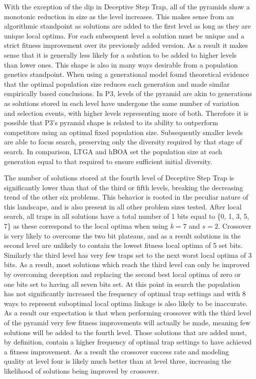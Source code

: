 \documentclass[twoside]{article}
\begin{document}
With the exception of the dip in Deceptive Step Trap, all of the pyramids show a monotonic reduction
in size as the level increases. This makes sense from an algorithmic standpoint as solutions are
added to the first level as long as they are unique local optima. For each subsequent level a
solution must be unique and a strict fitness improvement over its previously added version.
As a result it makes sense that it is generally less likely for a solution to be added to
higher levels than lower ones. This shape is also in many ways desirable from a population
genetics standpoint. When using a generational model \cite{lobo:2011:dynamicpop} found theoretical
evidence that the optimal population size reduces each generation and \cite{goldman:2011:dynamic-parameters}
made similar empirically based conclusions. In P3, levels of the pyramid are akin to generations as solutions
stored in each level have undergone the same number of variation and selection events,
with higher levels representing more of both. Therefore it is possible that P3's
pyramid shape is related to its ability to outperform competitors using an optimal
fixed population size. Subsequently smaller levels are able to focus search,
preserving only the diversity required by that stage of search. In comparison,
LTGA and hBOA set the population size at each generation equal to that required
to ensure sufficient initial diversity.

The number of solutions stored at the fourth level of Deceptive Step Trap is
significantly lower than that of the third or fifth levels, breaking the decreasing
trend of the other six problems. This behavior is rooted in the peculiar nature
of this landscape, and is also present in all other problem sizes tested.
After local search, all traps in all solutions have a total
number of 1 bits equal to \{0, 1, 3, 5, 7\} as these correspond to the local
optima when using $k=7$ and $s=2$. Crossover is very likely to overcome the
two bit plateaus, and as a result solutions in the second level are unlikely
to contain the lowest fitness local optima of 5 set bits. Similarly the third
level has very few traps set to the next worst local optima of 3 bits. As a result,
most solutions which reach the third level can only be improved by overcoming deception
and replacing the second best local optima of zero or one bits set to having all seven bits set.
At this point in search the population has not significantly increased the frequency of optimal
trap settings and with 8 ways to represent suboptimal local optima linkage is also likely to be
inaccurate. As a result our expectation is that when performing crossover with the third level
of the pyramid very few fitness improvements will actually be made, meaning
few solutions will be added to the fourth level. Those solutions that are added must, by definition,
contain a higher frequency of optimal trap settings to have achieved a fitness improvement. As
a result the crossover success rate and modeling quality at level four is likely much better
than at level three, increasing the likelihood of solutions being improved by crossover.
\end{document}
